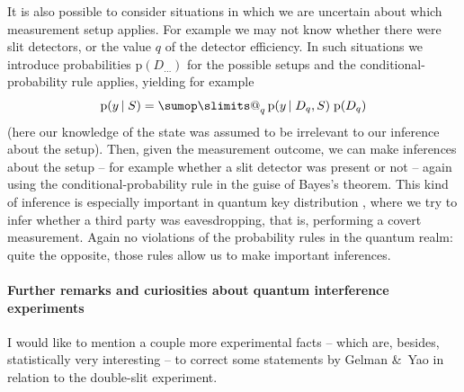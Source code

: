 \documentclass[\ifafour a4paper,12pt,\else a5paper,10pt,\fi%
onecolumn,oneside,article,%
british%
]{memoir}
\makeatletter
\theoremstyle{remark}
\theoremstyle{innote}
\def\sum{\DOTSI\sumop\slimits@}
\newcommand*{\citep}{\parencites}%
\newcommand*{\amp}{\&}
\newcommand*{\pf}{\mathrm{p}}%
\renewcommand*{\|}[1][]{\nonscript\,#1\vert\nonscript\;\mathopen{}}
\newcommand*{\tsum}{\mathop{\textstyle\sum}\nolimits}
\newcommand*{\yDq}{D_{q}}
\makeatother
\begin{document}
It is also possible to consider situations in which we are uncertain about
which measurement setup applies. For example we may not know whether there
were slit detectors, or the value $q$ of the detector efficiency. In such
situations we introduce probabilities $\pf(D_{\dotso})$ for the possible
setups and the conditional-probability rule applies, yielding for example
\begin{equation}
  \label{eq:conditional_setups}
  \pf(y \| S) = \tsum_{q} \pf(y \| \yDq, S)\;\pf(\yDq)
\end{equation}
(here our knowledge of the state was assumed to be irrelevant to our
inference about the setup). Then, given the measurement outcome, we can
make inferences about the setup
\citep{barnettetal2003,zimanetal2004_r2006,darianoetal2004}[see
also][]{rigoetal1998} -- for example whether a slit detector was present or
not -- again using the conditional-probability rule in the guise of Bayes's
theorem. This kind of inference is especially important in quantum key
distribution \citep{nielsenetal2000_r2010}, where we try to infer whether a
third party was eavesdropping, that is, performing a covert measurement.
Again no violations of the probability rules in the quantum realm: quite
the opposite, those rules allow us to make important inferences.


\bigskip

\paragraph{Further remarks and curiosities about quantum interference
  experiments}

I would like to mention a couple more experimental facts -- which are,
besides, statistically very interesting -- to correct some statements by
Gelman \amp\ Yao in relation to the double-slit experiment.
\end{document}
